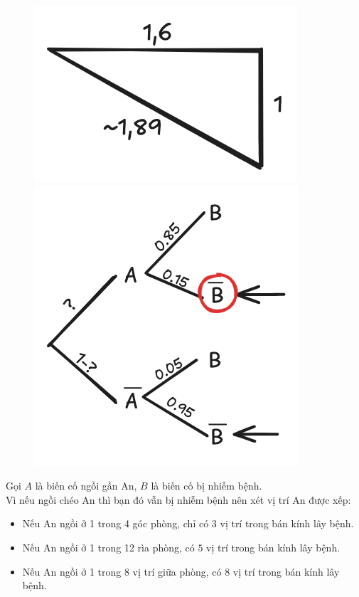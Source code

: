 \documentclass[twoside,final]{hcmut-report}
\begin{document}
\begin{figure}
    \centering
    \includegraphics[width=0.8\linewidth]{images/Nghệ An 2025 - Đợt 3/NgheAn25-3.png}
    \includegraphics[width=1.2\linewidth]{images/Nghệ An 2025 - Đợt 3/NgheAn25-4.png}
\end{figure}
Gọi $A$ là biến cố ngồi gần An, $B$ là biến cố bị nhiễm bệnh.\\
Vì nếu ngồi chéo An thì bạn đó vẫn bị nhiễm bệnh nên xét vị trí An được xếp:
\begin{itemize}[itemsep=0pt, topsep=0pt, parsep=0pt,label=-]
    \item Nếu An ngồi ở 1 trong 4 góc phòng, chỉ có $3$ vị trí trong bán kính lây bệnh.
    \item Nếu An ngồi ở 1 trong 12 rìa phòng, có $5$ vị trí trong bán kính lây bệnh.
    \item Nếu An ngồi ở 1 trong 8 vị trí giữa phòng, có $8$ vị trí trong bán kính lây bệnh.
\end{itemize}
\end{document}
